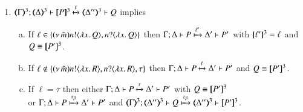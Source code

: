 \begin{proposition}
\begin{enumerate}
		\item	%
			$\horel{\tmap{\Gamma}{3}}{\tmap{\Delta}{3}}{\pmap{P}{3}}{\hby{\ell}}
			{\tmap{\Delta''}{3}}{Q}$ implies
%
			\begin{enumerate}[a)]
				\item	If $\ell \in \{(\nu\, \tilde{m}) n ! \langle \lambda x.\,Q \rangle, n ? \langle \lambda x.\,Q \rangle\}$
					then
					$\Gamma; \Delta \vdash P \xmapsto{\ell'} \Delta' \vdash P'$
					with $\{\!\!\{\ell'\}\!\!\}^{3} = \ell$ and $Q \equiv [\!\![P']\!\!]^3$.

				\item	If $\ell \notin \{(\nu\, \tilde{m}) n ! \langle \lambda x.\,R \rangle, n ? \langle \lambda x.\,R \rangle, \tau\}$
					then
					$\Gamma; \Delta \vdash P \xmapsto{\ell} \Delta' \vdash P'$ and $Q \equiv [\!\![P']\!\!]^3$.

				\item	If $\ell = \tau$ then
					either
					$\Gamma; \Delta \vdash P \xmapsto{\tau} \Delta' \vdash P'$ with $Q \equiv [\!\![P']\!\!]^3$\\
					or
					$\Gamma; \Delta \vdash P \xmapsto{\tau_{\beta}} \Delta' \vdash P'$ and
					$\horel{\tmap{\Gamma}{3}}{\tmap{\Delta''}{3}}{Q}{\hby{\btau}}
					{\tmap{\Delta''}{3}}{\pmap{P'}{3}}$.
			\end{enumerate}
	\end{enumerate}
\end{proposition}

